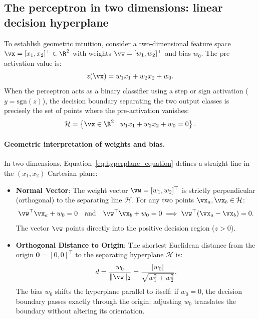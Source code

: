 \documentclass[../../main.tex]{subfiles}
\begin{document}
\subsection{The perceptron in two dimensions: linear decision hyperplane}
To establish geometric intuition, consider a two-dimensional feature space $\vx = [x_1, x_2]^\top \in \R^2$ with weights $\vw = [w_1, w_2]^\top$ and bias $w_0$. The pre-activation value is:
\begin{equation}
\label{eq:2d_linear_boundary}
z(\vx) = w_1 x_1 + w_2 x_2 + w_0.
\end{equation}
When the perceptron acts as a binary classifier using a step or sign activation ($y = \text{sgn}(z)$), the decision boundary separating the two output classes is precisely the set of points where the pre-activation vanishes:
\begin{equation}
\label{eq:hyperplane_equation}
\mathcal{H} = \left\{ \vx \in \R^2 \mid w_1 x_1 + w_2 x_2 + w_0 = 0 \right\}.
\end{equation}

\paragraph{Geometric interpretation of weights and bias.}
In two dimensions, Equation~\eqref{eq:hyperplane_equation} defines a straight line in the $(x_1, x_2)$ Cartesian plane:
\begin{itemize}
    \item \textbf{Normal Vector}: The weight vector $\vw = [w_1, w_2]^\top$ is strictly perpendicular (orthogonal) to the separating line $\mathcal{H}$. For any two points $\vx_a, \vx_b \in \mathcal{H}$:
    \[
    \vw^\top \vx_a + w_0 = 0 \quad \text{and} \quad \vw^\top \vx_b + w_0 = 0 \implies \vw^\top (\vx_a - \vx_b) = 0.
    \]
    The vector $\vw$ points directly into the positive decision region ($z > 0$).
    \item \textbf{Orthogonal Distance to Origin}: The shortest Euclidean distance from the origin $\mathbf{0} = [0, 0]^\top$ to the separating hyperplane $\mathcal{H}$ is:
    \begin{equation}
    \label{eq:hyperplane_distance}
    d = \frac{|w_0|}{\|\vw\|_2} = \frac{|w_0|}{\sqrt{w_1^2 + w_2^2}}.
    \end{equation}
    The bias $w_0$ shifts the hyperplane parallel to itself: if $w_0 = 0$, the decision boundary passes exactly through the origin; adjusting $w_0$ translates the boundary without altering its orientation.
\end{itemize}
\end{document}
